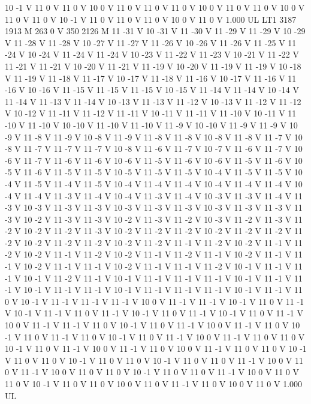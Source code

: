 {10 -1 V
11 0 V
11 0 V
10 0 V
11 0 V
11 0 V
11 0 V
10 0 V
11 0 V
11 0 V
10 0 V
11 0 V
11 0 V
10 -1 V
11 0 V
11 0 V
11 0 V
10 0 V
11 0 V
1.000 UL
LT1
3187 1913 M
263 0 V
350 2126 M
11 -31 V
10 -31 V
11 -30 V
11 -29 V
11 -29 V
10 -29 V
11 -28 V
11 -28 V
10 -27 V
11 -27 V
11 -26 V
10 -26 V
11 -26 V
11 -25 V
11 -24 V
10 -24 V
11 -24 V
11 -24 V
10 -23 V
11 -22 V
11 -23 V
10 -21 V
11 -22 V
11 -21 V
11 -21 V
10 -20 V
11 -21 V
11 -19 V
10 -20 V
11 -19 V
11 -19 V
10 -18 V
11 -19 V
11 -18 V
11 -17 V
10 -17 V
11 -18 V
11 -16 V
10 -17 V
11 -16 V
11 -16 V
10 -16 V
11 -15 V
11 -15 V
11 -15 V
10 -15 V
11 -14 V
11 -14 V
10 -14 V
11 -14 V
11 -13 V
11 -14 V
10 -13 V
11 -13 V
11 -12 V
10 -13 V
11 -12 V
11 -12 V
10 -12 V
11 -11 V
11 -12 V
11 -11 V
10 -11 V
11 -11 V
11 -10 V
10 -11 V
11 -10 V
11 -10 V
10 -10 V
11 -10 V
11 -10 V
11 -9 V
10 -10 V
11 -9 V
11 -9 V
10 -9 V
11 -8 V
11 -9 V
10 -8 V
11 -9 V
11 -8 V
11 -8 V
10 -8 V
11 -8 V
11 -7 V
10 -8 V
11 -7 V
11 -7 V
11 -7 V
10 -8 V
11 -6 V
11 -7 V
10 -7 V
11 -6 V
11 -7 V
10 -6 V
11 -7 V
11 -6 V
11 -6 V
10 -6 V
11 -5 V
11 -6 V
10 -6 V
11 -5 V
11 -6 V
10 -5 V
11 -6 V
11 -5 V
11 -5 V
10 -5 V
11 -5 V
11 -5 V
10 -4 V
11 -5 V
11 -5 V
10 -4 V
11 -5 V
11 -4 V
11 -5 V
10 -4 V
11 -4 V
11 -4 V
10 -4 V
11 -4 V
11 -4 V
10 -4 V
11 -4 V
11 -3 V
11 -4 V
10 -4 V
11 -3 V
11 -4 V
10 -3 V
11 -3 V
11 -4 V
11 -3 V
10 -3 V
11 -3 V
11 -3 V
10 -3 V
11 -3 V
11 -3 V
10 -3 V
11 -3 V
11 -3 V
11 -3 V
10 -2 V
11 -3 V
11 -3 V
10 -2 V
11 -3 V
11 -2 V
10 -3 V
11 -2 V
11 -3 V
11 -2 V
10 -2 V
11 -2 V
11 -3 V
10 -2 V
11 -2 V
11 -2 V
10 -2 V
11 -2 V
11 -2 V
11 -2 V
10 -2 V
11 -2 V
11 -2 V
10 -2 V
11 -2 V
11 -1 V
11 -2 V
10 -2 V
11 -1 V
11 -2 V
10 -2 V
11 -1 V
11 -2 V
10 -2 V
11 -1 V
11 -2 V
11 -1 V
10 -2 V
11 -1 V
11 -1 V
10 -2 V
11 -1 V
11 -1 V
10 -2 V
11 -1 V
11 -1 V
11 -2 V
10 -1 V
11 -1 V
11 -1 V
10 -1 V
11 -2 V
11 -1 V
10 -1 V
11 -1 V
11 -1 V
11 -1 V
10 -1 V
11 -1 V
11 -1 V
10 -1 V
11 -1 V
11 -1 V
10 -1 V
11 -1 V
11 -1 V
11 -1 V
10 -1 V
11 -1 V
11 0 V
10 -1 V
11 -1 V
11 -1 V
11 -1 V
10 0 V
11 -1 V
11 -1 V
10 -1 V
11 0 V
11 -1 V
10 -1 V
11 -1 V
11 0 V
11 -1 V
10 -1 V
11 0 V
11 -1 V
10 -1 V
11 0 V
11 -1 V
10 0 V
11 -1 V
11 -1 V
11 0 V
10 -1 V
11 0 V
11 -1 V
10 0 V
11 -1 V
11 0 V
10 -1 V
11 0 V
11 -1 V
11 0 V
10 -1 V
11 0 V
11 -1 V
10 0 V
11 -1 V
11 0 V
11 0 V
10 -1 V
11 0 V
11 -1 V
10 0 V
11 -1 V
11 0 V
10 0 V
11 -1 V
11 0 V
11 0 V
10 -1 V
11 0 V
11 0 V
10 -1 V
11 0 V
11 0 V
10 -1 V
11 0 V
11 0 V
11 -1 V
10 0 V
11 0 V
11 -1 V
10 0 V
11 0 V
11 0 V
10 -1 V
11 0 V
11 0 V
11 -1 V
10 0 V
11 0 V
11 0 V
10 -1 V
11 0 V
11 0 V
10 0 V
11 0 V
11 -1 V
11 0 V
10 0 V
11 0 V
1.000 UL
}
